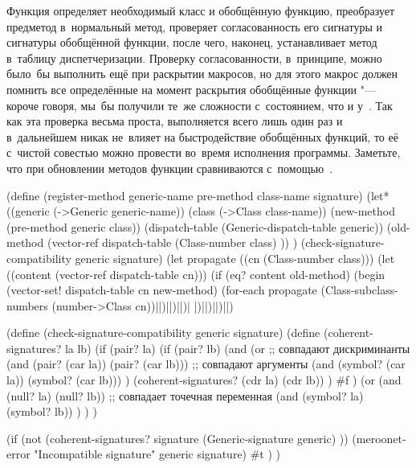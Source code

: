 Функция  определяет необходимый класс и обобщённую функцию,
преобразует предметод в~нормальный метод, проверяет согласованность его
сигнатуры и сигнатуры обобщённой функции, после чего, наконец, устанавливает
метод в~таблицу диспетчеризации. Проверку согласованности, в~принципе, можно
было~бы выполнить ещё при раскрытии макросов, но для этого макрос
 должен помнить все определённые на момент раскрытия
обобщённые функции "--- короче говоря, мы~бы получили те~же сложности
с~состоянием, что и у~. Так как эта проверка весьма проста,
выполняется всего лишь один раз и в~дальнейшем никак не~влияет на быстродействие
обобщённых функций, то её с~чистой совестью можно провести во~время исполнения
программы. Заметьте, что при обновлении методов функции сравниваются
с~помощью~.

\begin{code:lisp}
(define (register-method generic-name pre-method class-name signature)
  (let* ((generic (->Generic generic-name))
         (class (->Class class-name))
         (new-method (pre-method generic class))
         (dispatch-table (Generic-dispatch-table generic))
         (old-method (vector-ref dispatch-table
                                 (Class-number class) )) )
    (check-signature-compatibility generic signature)
    (let propagate ((cn (Class-number class)))
      (let ((content (vector-ref dispatch-table cn)))
        (if (eq? content old-method)
            (begin
              (vector-set! dispatch-table cn new-method)
              (for-each propagate
               (Class-subclass-numbers (number->Class cn))|\:|)|\:|)|\:|)|\:%
                                                             |)|\:|)|\:|)|\:|)

(define (check-signature-compatibility generic signature)
  (define (coherent-signatures? la lb)
    (if (pair? la)
        (if (pair? lb)
            (and (or
                  ;; совпадают дискриминанты
                  (and (pair? (car la)) (pair? (car lb)))
                  ;; совпадают аргументы
                  (and (symbol? (car la)) (symbol? (car lb))) )
              (coherent-signatures? (cdr la) (cdr lb)) )
            #f )
        (or (and (null? la) (null? lb))
            ;; совпадает точечная переменная
            (and (symbol? la) (symbol? lb)) ) ) )

  (if (not (coherent-signatures? signature
                                 (Generic-signature generic) ))
    (meroonet-error "Incompatible signature" generic signature)
    #t ) )
\end{code:lisp}


